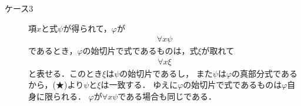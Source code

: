 \begin{metaprf}
\begin{description}
\begin{description}
		\item[ケース3] 項$x$と式$\psi$が得られて，$\varphi$が
			\begin{align}
				\forall x \psi
			\end{align}
			であるとき，$\varphi$の始切片で式であるものは，式$\xi$が取れて
			\begin{align}
				\forall x \xi
			\end{align}
			と表せる．このとき$\xi$は$\psi$の始切片であるし，
			また$\psi$は$\varphi$の真部分式であるから，(★)より$\psi$と$\xi$は一致する．
			ゆえに$\varphi$の始切片で式であるものは$\varphi$自身に限られる．
			$\varphi$が$\forall x \psi$である場合も同じである．
			\QED
	\end{description}

		\end{description}
	\end{metaprf}
	
